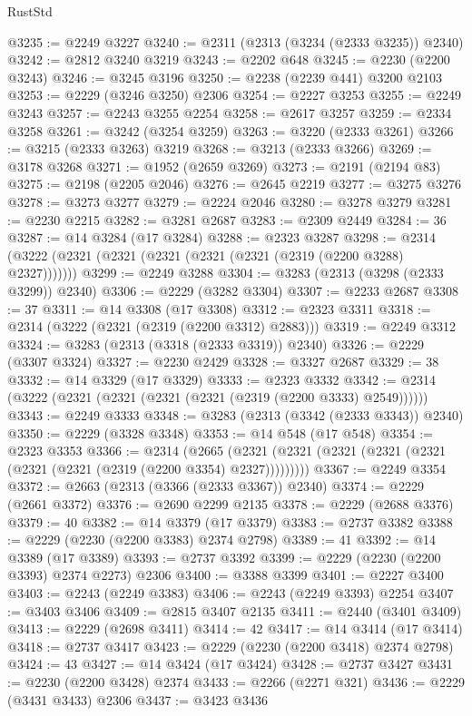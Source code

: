 \begin{lexlean}{RustStd}
\begin{coremodule}
@3235 := @2249 @3227
@3240 := @2311 (@2313 (@3234 (@2333 @3235)) @2340)
@3242 := @2812 @3240 @3219
@3243 := @2202 @648
@3245 := @2230 (@2200 @3243)
@3246 := @3245 @3196
@3250 := @2238 (@2239 @441) @3200 @2103
@3253 := @2229 (@3246 @3250) @2306
@3254 := @2227 @3253
@3255 := @2249 @3243
@3257 := @2243 @3255 @2254
@3258 := @2617 @3257
@3259 := @2334 @3258
@3261 := @3242 (@3254 @3259)
@3263 := @3220 (@2333 @3261)
@3266 := @3215 (@2333 @3263) @3219
@3268 := @3213 (@2333 @3266)
@3269 := @3178 @3268
@3271 := @1952 (@2659 @3269)
@3273 := @2191 (@2194 @83)
@3275 := @2198 (@2205 @2046)
@3276 := @2645 @2219
@3277 := @3275 @3276
@3278 := @3273 @3277
@3279 := @2224 @2046
@3280 := @3278 @3279
@3281 := @2230 @2215
@3282 := @3281 @2687
@3283 := @2309 @2449
@3284 := 36
@3287 := @14 @3284 (@17 @3284)
@3288 := @2323 @3287
@3298 := @2314 (@3222 (@2321 (@2321 (@2321 (@2321 (@2321 (@2319 (@2200 @3288) @2327)))))))
@3299 := @2249 @3288
@3304 := @3283 (@2313 (@3298 (@2333 @3299)) @2340)
@3306 := @2229 (@3282 @3304)
@3307 := @2233 @2687
@3308 := 37
@3311 := @14 @3308 (@17 @3308)
@3312 := @2323 @3311
@3318 := @2314 (@3222 (@2321 (@2319 (@2200 @3312) @2883)))
@3319 := @2249 @3312
@3324 := @3283 (@2313 (@3318 (@2333 @3319)) @2340)
@3326 := @2229 (@3307 @3324)
@3327 := @2230 @2429
@3328 := @3327 @2687
@3329 := 38
@3332 := @14 @3329 (@17 @3329)
@3333 := @2323 @3332
@3342 := @2314 (@3222 (@2321 (@2321 (@2321 (@2321 (@2319 (@2200 @3333) @2549))))))
@3343 := @2249 @3333
@3348 := @3283 (@2313 (@3342 (@2333 @3343)) @2340)
@3350 := @2229 (@3328 @3348)
@3353 := @14 @548 (@17 @548)
@3354 := @2323 @3353
@3366 := @2314
    (@2665 (@2321 (@2321 (@2321 (@2321 (@2321 (@2321 (@2321 (@2319 (@2200 @3354) @2327)))))))))
@3367 := @2249 @3354
@3372 := @2663 (@2313 (@3366 (@2333 @3367)) @2340)
@3374 := @2229 (@2661 @3372)
@3376 := @2690 @2299 @2135
@3378 := @2229 (@2688 @3376)
@3379 := 40
@3382 := @14 @3379 (@17 @3379)
@3383 := @2737 @3382
@3388 := @2229 (@2230 (@2200 @3383) @2374 @2798)
@3389 := 41
@3392 := @14 @3389 (@17 @3389)
@3393 := @2737 @3392
@3399 := @2229 (@2230 (@2200 @3393) @2374 @2273) @2306
@3400 := @3388 @3399
@3401 := @2227 @3400
@3403 := @2243 (@2249 @3383)
@3406 := @2243 (@2249 @3393) @2254
@3407 := @3403 @3406
@3409 := @2815 @3407 @2135
@3411 := @2440 (@3401 @3409)
@3413 := @2229 (@2698 @3411)
@3414 := 42
@3417 := @14 @3414 (@17 @3414)
@3418 := @2737 @3417
@3423 := @2229 (@2230 (@2200 @3418) @2374 @2798)
@3424 := 43
@3427 := @14 @3424 (@17 @3424)
@3428 := @2737 @3427
@3431 := @2230 (@2200 @3428) @2374
@3433 := @2266 (@2271 @321)
@3436 := @2229 (@3431 @3433) @2306
@3437 := @3423 @3436

\end{coremodule}
\end{lexlean}
